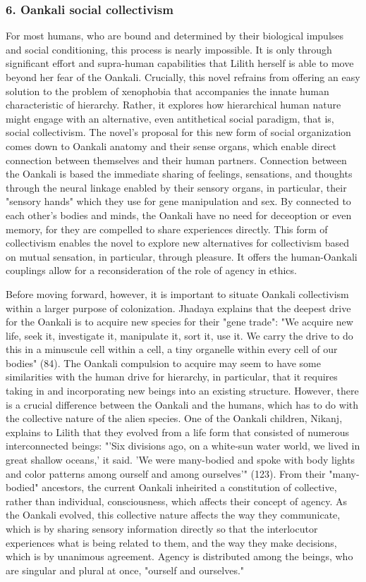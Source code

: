 \documentclass[11pt]{article}
\begin{document}
\subsubsection{6. Oankali social collectivism}
\label{sec:orgf479b49}
For most humans, who are bound and determined by their biological
impulses and social conditioning, this process is nearly
impossible. It is only through significant effort and supra-human
capabilities that Lilith herself is able to move beyond her fear of
the Oankali. Crucially, this novel refrains from offering an easy
solution to the problem of xenophobia that accompanies the innate
human characteristic of hierarchy. Rather, it explores how
hierarchical human nature might engage with an alternative, even
antithetical social paradigm, that is, social collectivism. The
novel's proposal for this new form of social organization comes down
to Oankali anatomy and their sense organs, which enable direct
connection between themselves and their human partners. Connection
between the Oankali is based the immediate sharing of feelings,
sensations, and thoughts through the neural linkage enabled by their
sensory organs, in particular, their "sensory hands" which they use
for gene manipulation and sex. By connected to each other's bodies and
minds, the Oankali have no need for deceoption or even memory, for
they are compelled to share experiences directly. This form of
collectivism enables the novel to explore new alternatives for
collectivism based on mutual sensation, in particular, through
pleasure. It offers the human-Oankali couplings allow for a
reconsideration of the role of agency in ethics.

Before moving forward, however, it is important to situate Oankali
collectivism within a larger purpose of colonization. Jhadaya explains
that the deepest drive for the Oankali is to acquire new species for
their "gene trade": "We acquire new life, seek it, investigate it,
manipulate it, sort it, use it. We carry the drive to do this in a
minuscule cell within a cell, a tiny organelle within every cell of
our bodies" (84). The Oankali compulsion to acquire may seem to have
some similarities with the human drive for hierarchy, in particular,
that it requires taking in and incorporating new beings into an
existing structure. However, there is a crucial difference between the
Oankali and the humans, which has to do with the collective nature of
the alien species. One of the Oankali children, Nikanj, explains to
Lilith that they evolved from a life form that consisted of numerous
interconnected beings: "'Six divisions ago, on a white-sun water
world, we lived in great shallow oceans,' it said. 'We were
many-bodied and spoke with body lights and color patterns among
ourself and among ourselves'" (123). From their "many-bodied"
ancestors, the current Oankali inheirited a constitution of
collective, rather than individual, consciousness, which affects their
concept of agency. As the Oankali evolved, this collective nature
affects the way they communicate, which is by sharing sensory
information directly so that the interlocutor experiences what is
being related to them, and the way they make decisions, which is by
unanimous agreement. Agency is distributed among the beings, who are
singular and plural at once, "ourself and ourselves."
\end{document}
